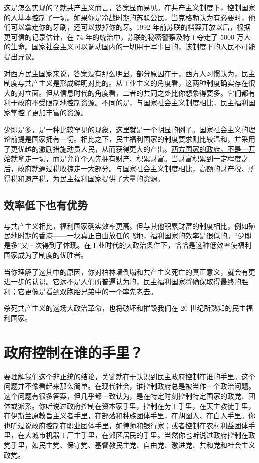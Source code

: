 这是怎么实现的？就共产主义而言，答案显而易见。在共产主义制度下，控制国家的人基本控制了一切。如果你是冷战时期的苏联公民，当克格勃认为有必要时，他们可以拿走你的牙刷，还可以拔掉你的牙。1992 年前苏联的档案开放以后，根据更可信的记录估计，在 74 年的统治中，苏联的秘密警察及特工夺走了 5000 万人的生命。国家社会主义可以调动国内的一切用于军事目的，该制度下的人民不可能提出异议。

对西方民主国家来说，答案没有那么明显。部分原因在于，西方人习惯认为，民主制度与共产主义是形成鲜明对比的。从工业主义的角度看，这两种制度确实存在很大的对立面。但从信息时代的角度看，二者的共同之处比你想象得要多。它们都有利于政府不受限制地控制资源。不同的是，与国家社会主义制度相比，民主福利国家掌控了更加丰富的资源。

少即是多，是一种比较罕见的现象，这里就是一个明显的例子。国家社会主义的理论前提是国家拥有一切。相比之下，民主福利国家的制度要求则比较温和，并采用了更优越的激励措施动员人民，从而获得更大的产出。\uline{西方国家的政府，不是一开始就拿走一切，而是允许个人先拥有财产、积累财富}。当财富积累到一定程度之后，政府就通过税收掠走一大部分。与国家社会主义制度相比，高额的财产税、所得税和遗产税，为民主福利国家提供了大量的资源。

\subsection{效率低下也有优势}
与共产主义相比，福利国家确实效率更高。但与其他积累财富的制度相比，例如殖民地时期的香港——一块真正自由放任的飞地，福利国家的效率是很低的。“少即是多”又一次得到了体现。在工业时代的大政治条件下，恰恰是这种低效率使福利国家成为了制度的优胜者。

当你理解了这其中的原因，你对柏林墙倒塌和共产主义死亡的真正意义，就会有更进一步的认识。它远不是人们所普遍认为的，民主福利国家将确保取得最终的胜利；它更像是看到双胞胎兄弟中的一个率先老去。

杀死共产主义的这场大政治革命，也将破坏和摧毁我们在 20 世纪所熟知的民主福利国家。

\section{政府控制在谁的手里？}
要理解我们这个非正统的结论，关键就在于认识到民主政府控制在谁的手里。这个问题并不像看起来那么简单。在现代社会，谁控制政府总是被当作一个政治问题。这个问题有很多答案，但几乎都一致认为，是在特定时刻控制特定国家的政党、团体或派系。你听说过政府控制在资本家手里，控制在劳工手里，在天主教徒手里，在伊斯兰原教旨主义者手里，在部落和种族团体手里，在胡图人、在白人手里。你也听过说政府控制在职业团体手里，如律师和银行家；或者控制在农村利益团体手里，在大城市机器工厂主手里，在郊区居民的手里。当然你也听说过政府控制在政党手里，如民主党、保守党、基督教民主党、自由党、激进党、共和党和社会主义政党。

